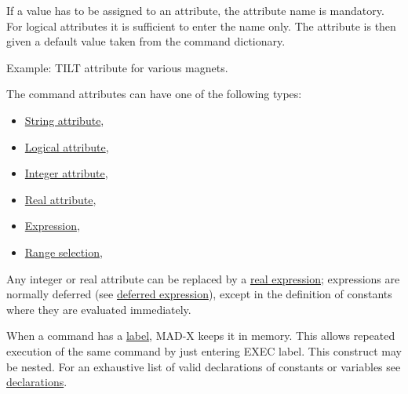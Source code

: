 If a value has to be assigned to an attribute, the
attribute name is mandatory.
For logical attributes it is sufficient to enter the name only.
The attribute is then given a default value taken from the
command dictionary.


Example: TILT attribute for various magnets.

The command attributes can have one of the following types:
\begin{itemize}
  \item \href{string.html}{String attribute},
  \item \href{logical.html}{Logical attribute},
  \item \href{integer.html}{Integer attribute},
  \item \href{real.html}{Real attribute},
  \item \href{expression.html}{Expression},
  \item \href{select.html}{Range selection},
\end{itemize}

Any integer or real attribute can be replaced by
a \href{expression.html}{real expression}; expressions are
normally deferred (see \href{expression.html#defer}{deferred
  expression}), except in the 
definition of constants where they are evaluated immediately.

When a command has a \href{label.html}{label},
MAD-X keeps it in memory.
This allows repeated execution of the same command
by just entering EXEC label. This construct may be nested.
For an exhaustive list of valid declarations of constants or variables
see \href{declarations.html}{declarations}.










